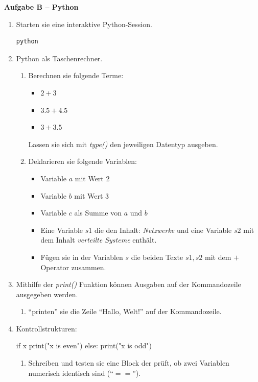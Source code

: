 \documentclass[paper=a4,fontsize=11pt]{scrartcl}%
\numberwithin{equation}{section}
\begin{document}
\newpage

\begin{center}\Large{\textbf{Aufgabe B -- Python}}\end{center}\vskip0.25in
\begin{enumerate}
	\item Starten sie eine interaktive Python-Session.
	\begin{lstlisting}[style=Bash, language=Bash]
python
\end{lstlisting}
	\item Python als Taschenrechner.
	\begin{enumerate}
	\item Berechnen sie folgende Terme:
		\begin{itemize}
			\item $2 + 3$
			\item $3.5 + 4.5$
			\item $3 + 3.5$
		\end{itemize}
		Lassen sie sich mit \emph{type()} den jeweiligen Datentyp ausgeben.
		\item Deklarieren sie folgende Variablen:
		\begin{itemize}
			\item Variable $a$ mit Wert $2$
			\item Variable $b$ mit Wert $3$
			\item Variable $c$ als Summe von $a$ und $b$
			\item Eine Variable $s1$ die den Inhalt: \emph{Netzwerke} und eine Variable $s2$ mit dem Inhalt \emph{verteilte Systeme} enthält.
			\item Fügen sie in der Variablen $s$ die beiden Texte $s1, s2$ mit dem $+$ Operator zusammen.
		\end{itemize}
	\end{enumerate}
	\item Mithilfe der \emph{print()} Funktion können Ausgaben auf der Kommandozeile ausgegeben werden.
	\begin{enumerate}
		\item \enquote{printen} sie die Zeile \enquote{Hallo, Welt!} auf der Kommandozeile.
	\end{enumerate}
	\item Kontrollstrukturen:
	\begin{python}
if x %
	print("x is even")
else:
	print("x is odd")
\end{python}
	\begin{enumerate}
		\item Schreiben und testen sie eine Block der prüft, ob zwei Variablen numerisch identisch sind (\enquote{$==$}). 

\end{enumerate}
\end{enumerate}
\end{document}
